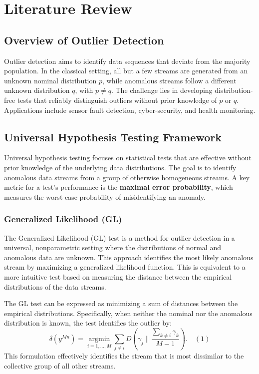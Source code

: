 \chapter{Literature Review}

\section{Overview of Outlier Detection}
Outlier detection aims to identify data sequences that deviate from the majority population. In the classical setting, all but a few streams are generated from an unknown nominal distribution $p$, while anomalous streams follow a different unknown distribution $q$, with $p \neq q$. The challenge lies in developing distribution-free tests that reliably distinguish outliers without prior knowledge of $p$ or $q$. Applications include sensor fault detection, cyber-security, and health monitoring.

\section{Universal Hypothesis Testing Framework}
Universal hypothesis testing focuses on statistical tests that are effective without prior knowledge of the underlying data distributions. The goal is to identify anomalous data streams from a group of otherwise homogeneous streams. A key metric for a test's performance is the \textbf{maximal error probability}, which measures the worst-case probability of misidentifying an anomaly.

\subsection{Generalized Likelihood (GL)}
The Generalized Likelihood (GL) test is a method for outlier detection in a universal, nonparametric setting where the distributions of normal and anomalous data are unknown. This approach identifies the most likely anomalous stream by maximizing a generalized likelihood function. This is equivalent to a more intuitive test based on measuring the distance between the empirical distributions of the data streams.

The GL test can be expressed as minimizing a sum of distances between the empirical distributions. Specifically, when neither the nominal nor the anomalous distribution is known, the test identifies the outlier by:
\[
\delta(y^{Mn}) = \underset{i=1,\dots,M}{\operatorname{argmin}} \sum_{j \neq i} D\left(\gamma_j \parallel \frac{\sum_{k \neq i} \gamma_k}{M-1}\right). \quad (1)
\]
This formulation effectively identifies the stream that is most dissimilar to the collective group of all other streams.

